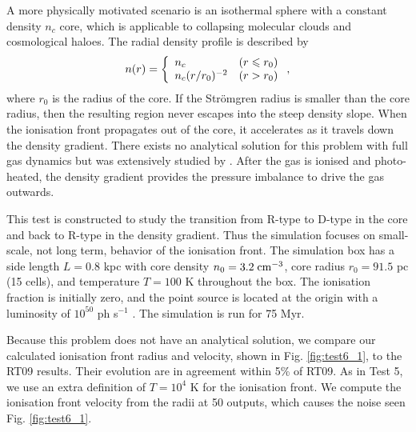 \documentclass[useAMS,usenatbib]{mn2e}
\begin{document}
A more physically motivated scenario is an isothermal sphere with a
constant density $n_c$ core, which is applicable to collapsing
molecular clouds and cosmological haloes.  The radial density profile
is described by
%
\begin{equation}
  \label{eqn:test6_rho}
  n(r) = \left\{ \begin{array}{l@{\quad}l}
      n_c & (r \le r_0)\\
      n_c (r/r_0)^{-2} & (r > r_0)
    \end{array} \right. ,
\end{equation}
where $r_0$ is the radius of the core.  If the Str\"{o}mgren radius is
smaller than the core radius, then the resulting \hii region
never escapes into the steep density slope.  When the ionisation front
propagates out of the core, it accelerates as it travels down the
density gradient.  There exists no analytical solution for this
problem with full gas dynamics but was extensively studied by
\citet{Franco90}.  After the gas is ionised and photo-heated, the
density gradient provides the pressure imbalance to drive the gas
outwards.

This test is constructed to study the transition from R-type to D-type
in the core and back to R-type in the density gradient.  Thus the
simulation focuses on small-scale, not long term, behavior of the
ionisation front.  The simulation box has a side length $L = 0.8$ kpc
with core density $n_0 = 3.2\;\cubecm$, core radius $r_0 = 91.5$ pc
(15 cells), and temperature $T = 100$ K throughout the box.  The
ionisation fraction is initially zero, and the point source is located
at the origin with a luminosity of $10^{50}$ ph s$^{-1}$ \cubecm.  The
simulation is run for 75 Myr.

Because this problem does not have an analytical solution, we compare
our calculated ionisation front radius and velocity, shown in Fig.
\ref{fig:test6_1}, to the RT09 results.  Their evolution are in
agreement within 5\% of RT09.  As in Test 5, we use an extra
definition of $T=10^4$ K for the ionisation front.  We compute the
ionisation front velocity from the radii at 50 outputs, which causes
the noise seen Fig. \ref{fig:test6_1}.
\end{document}
